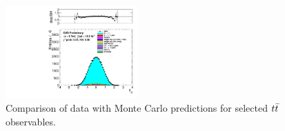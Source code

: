 \begin{figure}[phtb]
  \includegraphics[width=0.45\textwidth]{figures/dataMC_ttRapidity2.pdf}
  \caption{Comparison of data with Monte Carlo predictions for
    selected $t\bar{t}$ observables.}
  \label{fig:afb:datamcttvars}
\end{figure}

